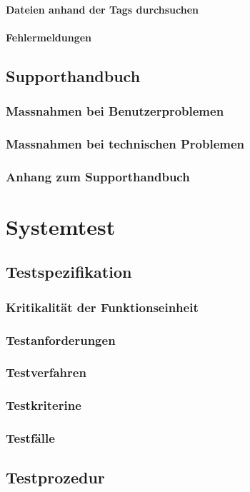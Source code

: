 \documentclass[10pt,paper=a4,final]{scrartcl}
\begin{document}
\paragraph{Dateien anhand der Tags durchsuchen}
\paragraph{Fehlermeldungen}
\subsection{Supporthandbuch}
\subsubsection{Massnahmen bei Benutzerproblemen}
\subsubsection{Massnahmen bei technischen Problemen}
\subsubsection{Anhang zum Supporthandbuch}
\section{Systemtest}
\subsection{Testspezifikation}
\subsubsection{Kritikalit\"at der Funktionseinheit}
\subsubsection{Testanforderungen}
\subsubsection{Testverfahren}
\subsubsection{Testkriterine}
\subsubsection{Testf\"alle}
\subsection{Testprozedur}
\end{document}
